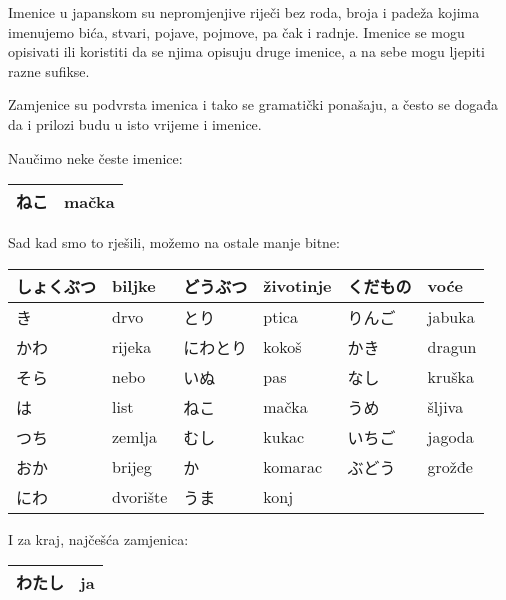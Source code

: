 
\author{Tomislav Mamić, Željka Ludošan}


	
	
	Imenice u japanskom su nepromjenjive riječi bez roda, broja i padeža kojima imenujemo bića, stvari, pojave, pojmove, pa čak i radnje. Imenice se mogu opisivati ili koristiti da se njima opisuju druge imenice, a na sebe mogu ljepiti razne sufikse. 

Zamjenice su podvrsta imenica i tako se gramatički ponašaju, a često se događa da i  prilozi budu u isto vrijeme i imenice.

Naučimo neke česte imenice:
\vspace{10pt}

	\begin{tabular}{|l|l|}
		\hline
		ねこ&mačka\\\hline
	\end{tabular}
	\vspace{10pt}
	
	Sad kad smo to rješili, možemo na ostale manje bitne:
	
	\vspace{10pt}
	\begin{tabular}{|l|l|l||l||l||l|}
		\hline
		しょくぶつ&biljke&どうぶつ&životinje&くだもの&voće\\\hline
		き&drvo&とり&ptica&りんご&jabuka\\\hline
		かわ&rijeka&にわとり&kokoš&かき&dragun\\\hline
		そら&nebo&いぬ&pas&なし&kruška\\\hline
		は&list&ねこ&mačka&うめ&šljiva\\\hline
		つち&zemlja&むし&kukac&いちご&jagoda\\\hline
		おか&brijeg&か&komarac&ぶどう&grožđe\\\hline
		にわ&dvorište&うま&konj&&\\\hline
	\end{tabular}

	
	\vspace{10pt}
	I za kraj, najčešća zamjenica:
	
	\vspace{10pt}
	\begin{tabular}{|l|l|}
		\hline
		わたし&ja\\\hline
	\end{tabular}
	\vspace{10pt}

